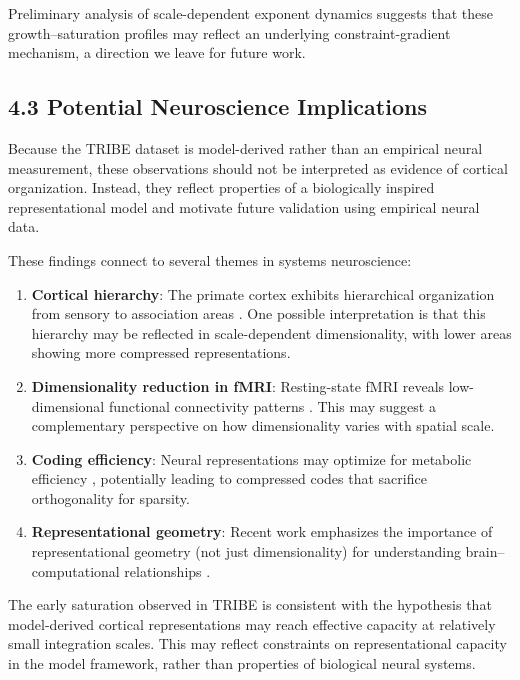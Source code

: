 Preliminary analysis of scale-dependent exponent dynamics suggests that these growth--saturation profiles may reflect an underlying constraint-gradient mechanism, a direction we leave for future work.

\subsection{4.3 Potential Neuroscience Implications}

Because the TRIBE dataset is model-derived rather than an empirical neural measurement, these observations should not be interpreted as evidence of cortical organization. Instead, they reflect properties of a biologically inspired representational model and motivate future validation using empirical neural data.

These findings connect to several themes in systems neuroscience:

\begin{enumerate}
	\item \textbf{Cortical hierarchy}: The primate cortex exhibits hierarchical organization from sensory to association areas \citep{Markov2013}. One possible interpretation is that this hierarchy may be reflected in scale-dependent dimensionality, with lower areas showing more compressed representations.

	\item \textbf{Dimensionality reduction in fMRI}: Resting-state fMRI reveals low-dimensional functional connectivity patterns \citep{Margulies2016}. This may suggest a complementary perspective on how dimensionality varies with spatial scale.

	\item \textbf{Coding efficiency}: Neural representations may optimize for metabolic efficiency \citep{Chung2019}, potentially leading to compressed codes that sacrifice orthogonality for sparsity.

	\item \textbf{Representational geometry}: Recent work emphasizes the importance of representational geometry (not just dimensionality) for understanding brain--computational relationships \citep{Kriegeskorte2013}.
\end{enumerate}

The early saturation observed in TRIBE is consistent with the hypothesis that model-derived cortical representations may reach effective capacity at relatively small integration scales. This may reflect constraints on representational capacity in the model framework, rather than properties of biological neural systems.

